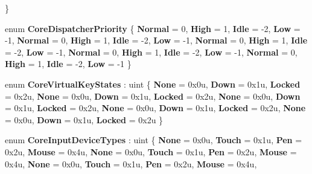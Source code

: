 \begin{DoxyCompactItemize}
 \}
\item 
\mbox{\label{namespace_windows_1_1_u_i_1_1_core_a612646cf897e13d073df58cbf255fea7}} 
enum {\bfseries Core\+Dispatcher\+Priority} \{ \newline
{\bfseries Normal} = 0, 
{\bfseries High} = 1, 
{\bfseries Idle} = -\/2, 
{\bfseries Low} = -\/1, 
\newline
{\bfseries Normal} = 0, 
{\bfseries High} = 1, 
{\bfseries Idle} = -\/2, 
{\bfseries Low} = -\/1, 
\newline
{\bfseries Normal} = 0, 
{\bfseries High} = 1, 
{\bfseries Idle} = -\/2, 
{\bfseries Low} = -\/1, 
\newline
{\bfseries Normal} = 0, 
{\bfseries High} = 1, 
{\bfseries Idle} = -\/2, 
{\bfseries Low} = -\/1, 
\newline
{\bfseries Normal} = 0, 
{\bfseries High} = 1, 
{\bfseries Idle} = -\/2, 
{\bfseries Low} = -\/1
 \}
\item 
\mbox{\label{namespace_windows_1_1_u_i_1_1_core_aa71ac02d1eeaccb86184a016581721ab}} 
enum {\bfseries Core\+Virtual\+Key\+States} \+: uint \{ \newline
{\bfseries None} = 0x0u, 
{\bfseries Down} = 0x1u, 
{\bfseries Locked} = 0x2u, 
{\bfseries None} = 0x0u, 
\newline
{\bfseries Down} = 0x1u, 
{\bfseries Locked} = 0x2u, 
{\bfseries None} = 0x0u, 
{\bfseries Down} = 0x1u, 
\newline
{\bfseries Locked} = 0x2u, 
{\bfseries None} = 0x0u, 
{\bfseries Down} = 0x1u, 
{\bfseries Locked} = 0x2u, 
\newline
{\bfseries None} = 0x0u, 
{\bfseries Down} = 0x1u, 
{\bfseries Locked} = 0x2u
 \}
\item 
\mbox{\label{namespace_windows_1_1_u_i_1_1_core_a77ab8ebe40609e15ad86f2c13a357af6}} 
enum {\bfseries Core\+Input\+Device\+Types} \+: uint \{ \newline
{\bfseries None} = 0x0u, 
{\bfseries Touch} = 0x1u, 
{\bfseries Pen} = 0x2u, 
{\bfseries Mouse} = 0x4u, 
\newline
{\bfseries None} = 0x0u, 
{\bfseries Touch} = 0x1u, 
{\bfseries Pen} = 0x2u, 
{\bfseries Mouse} = 0x4u, 
\newline
{\bfseries None} = 0x0u, 
{\bfseries Touch} = 0x1u, 
{\bfseries Pen} = 0x2u, 
{\bfseries Mouse} = 0x4u, 

\end{DoxyCompactItemize}

